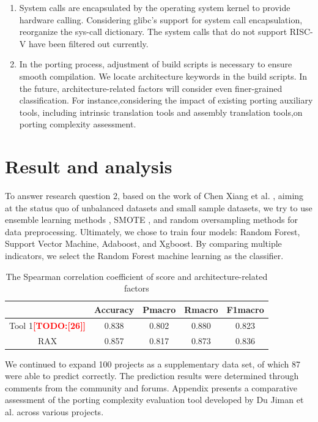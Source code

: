 \documentclass[sigconf,screen,review]{acmart}
\newcommand{\todo}[1]{\textcolor{red}{\textbf{[TODO:#1]}}}
\begin{document}
\begin{enumerate}
  \item System calls are encapsulated by the operating system kernel to provide hardware calling.
  Considering glibc's support for system call encapsulation, reorganize the sys-call dictionary.
  The system calls that do not support RISC-V have been filtered out currently.
  \item In the porting process, adjustment of build scripts is necessary to ensure smooth compilation.
  We locate architecture keywords in the build scripts.
  In the future, architecture-related factors will consider even finer-grained classification.
  For instance,considering the impact of existing porting auxiliary tools, including intrinsic translation tools and assembly translation tools,on porting complexity assessment.
\end{enumerate}

\section{Result and analysis}

To answer research question 2, based on the work of Chen Xiang et al. \cite{5128907}, aiming at the status quo of unbalanced datasets and small sample datasets, we try to use ensemble learning methods \cite{6509481}, SMOTE \cite{4271036}, and random oversampling methods for data preprocessing.
Ultimately, we chose to train four models: Random Forest, Support Vector Machine, Adaboost, and Xgboost.
By comparing multiple indicators, we select the Random Forest machine learning as the classifier.

\begin{table}
  \caption{The Spearman correlation coefficient of score and architecture-related factors}
  \label{tab:evaluation}
  \begin{tabular}{ccccc}
    \toprule
     & Accuracy & Pmacro & Rmacro & F1macro \\
    \midrule
    Tool 1\todo{[26]} & 0.838 & 0.802 & 0.880 & 0.823 \\
    RAX & 0.857 & 0.817 & 0.873 & 0.836 \\
  \bottomrule
\end{tabular}
\end{table}

We continued to expand 100 projects as a supplementary data set, of which 87 were able to predict correctly.
The prediction results were determined through comments from the community and forums.
Appendix presents a comparative assessment of the porting complexity evaluation tool developed by Du Jiman et al. across various projects.
\end{document}
